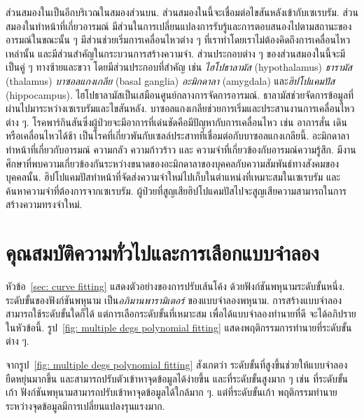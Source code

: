 {\begin{shaded}
		ส่วนสมองในเป็นอีกบริเวณในสมองส่วนบน.
		ส่วนสมองในนี้จะเชื่อมต่อไขสันหลังเข้ากับเซเรบรัม.
		ส่วนสมองในทำหน้าที่เกี่ยวอารมณ์  
		มีส่วนในการเปลี่ยนแปลงการรับรู้และการตอบสนองไปตามสถานะของอารมณ์ในขณะนั้น ๆ
		มีส่วนช่วยเริ่มการเคลื่อนไหวต่าง ๆ ที่เราทำโดยเราไม่ต้องคิดถึงการเคลื่อนไหวเหล่านั้น
		และมีส่วนสำคัญในกระบวนการสร้างความจำ.
		ส่วนประกอบต่าง ๆ ของส่วนสมองในนี้จะมีเป็นคู่ ๆ ทางซ้ายและขวา โดยมีส่วนประกอบที่สำคัญ เช่น
		\textit{ไฮโปธาลามัส} (hypothalamus)
		\textit{ธารามัส} (thalamus)
		\textit{บาซอลแกงเกลีย} (basal ganglia)
		\textit{อะมิกดาลา} (amygdala)
		และ\textit{ฮิปโปแคมปัส} (hippocampus).
		ไฮโปธาลามัสเป็นเสมือนศูนย์กลางการจัดการอารมณ์.
		ธาลามัสช่วยจัดการข้อมูลที่ผ่านไปมาระหว่างเซเรบรัมและไขสันหลัง.
		บาซอลแกงเกลียช่วยการเริ่มและประสานงานการเคลื่อนไหวต่าง ๆ.
		โรคพาร์กินสันซึ่งผู้ป่วยจะมีอาการที่เด่นชัดคือมีปัญหากับการเคลื่อนไหว เช่น อาการสั่น เดินหรือเคลื่อนไหวได้ช้า
		เป็นโรคที่เกี่ยวพันกับเซลล์ประสาทที่เชื่อมต่อกับบาซอลแกงเกลียนี้.
		อะมิกดาลาทำหน้าที่เกี่ยวกับอารมณ์ ความกลัว ความก้าวร้าว และ ความจำที่เกี่ยวข้องกับอารมณ์ความรู้สึก.
		มีงานศึกษาที่พบความเกี่ยวข้องกันระหว่างขนาดของอะมิกดาลาของบุคคลกับความสัมพันธ์ทางสังคมของบุคคลนั้น.
		ฮิปโปแคมปัสทำหน้าที่จัดส่งความจำใหม่ไปเก็บในตำแหน่งที่เหมาะสมในเซเรบรัม
		และค้นหาความจำที่ต้องการจากเซเรบรัม.
		ผู้ป่วยที่สูญเสียฮิปโปแคมปัสไปจะสูญเสียความสามารถในการสร้างความทรงจำใหม่.
		
	\end{shaded}
}%



\section{คุณสมบัติความทั่วไปและการเลือกแบบจำลอง}
\label{sec: model selection}

หัวข้อ~\ref{sec: curve fitting}
แสดงตัวอย่างของการปรับเส้นโค้ง
ด้วยฟังก์ชันพหุนามระดับขั้นหนึ่ง.
ระดับขั้นของฟังก์ชันพหุนาม
เป็น\textit{อภิมานพารามิเตอร์}
ของแบบจำลองพหุนาม.
การสร้างแบบจำลองสามารถใช้ระดับขั้นใดก็ได้
แต่การเลือกระดับขั้นที่เหมาะสม เพื่อได้แบบจำลองทำนายที่ดี
จะได้อภิปรายในหัวข้อนี้.
รูป~\ref{fig: multiple degs polynomial fitting} 
แสดงพฤติกรรมการทำนายที่ระดับขั้นต่าง ๆ.

จากรูป~\ref{fig: multiple degs polynomial fitting}
สังเกตว่า ระดับขั้นที่สูงขึ้นช่วยให้แบบจำลองยืดหยุ่นมากขึ้น
และสามารถปรับตัวเข้าหาจุดข้อมูลได้ง่ายขึ้น
และที่ระดับขั้นสูงมาก ๆ เช่น 
ที่ระดับขั้นเก้า ฟังก์ชันพหุนามสามารถปรับเข้าหาจุดข้อมูลได้ใกล้มาก ๆ.
แต่ที่ระดับขั้นเก้า
พฤติกรรมทำนาย ระหว่างจุดข้อมูลมีการเปลี่ยนแปลงรุนแรงมาก.

